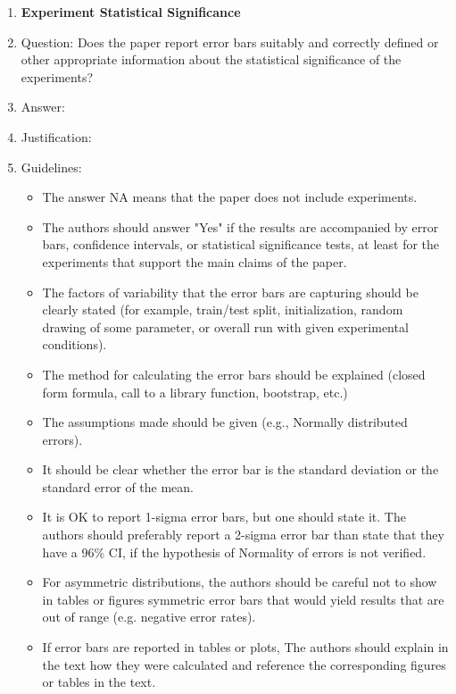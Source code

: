 \documentclass{article} %
\newcounter{ct}
\theoremstyle{definition}
\theoremstyle{remark}
\begin{document}
\begin{enumerate}
\item {\bf Experiment Statistical Significance}
    \item[] Question: Does the paper report error bars suitably and correctly defined or other appropriate information about the statistical significance of the experiments?
    \item[] Answer: \answerTODO{} %
    \item[] Justification: \justificationTODO{}
    \item[] Guidelines:
    \begin{itemize}
        \item The answer NA means that the paper does not include experiments.
        \item The authors should answer "Yes" if the results are accompanied by error bars, confidence intervals, or statistical significance tests, at least for the experiments that support the main claims of the paper.
        \item The factors of variability that the error bars are capturing should be clearly stated (for example, train/test split, initialization, random drawing of some parameter, or overall run with given experimental conditions).
        \item The method for calculating the error bars should be explained (closed form formula, call to a library function, bootstrap, etc.)
        \item The assumptions made should be given (e.g., Normally distributed errors).
        \item It should be clear whether the error bar is the standard deviation or the standard error of the mean.
        \item It is OK to report 1-sigma error bars, but one should state it. The authors should preferably report a 2-sigma error bar than state that they have a 96\% CI, if the hypothesis of Normality of errors is not verified.
        \item For asymmetric distributions, the authors should be careful not to show in tables or figures symmetric error bars that would yield results that are out of range (e.g. negative error rates).
        \item If error bars are reported in tables or plots, The authors should explain in the text how they were calculated and reference the corresponding figures or tables in the text.
    \end{itemize}


\end{enumerate}
\end{document}
